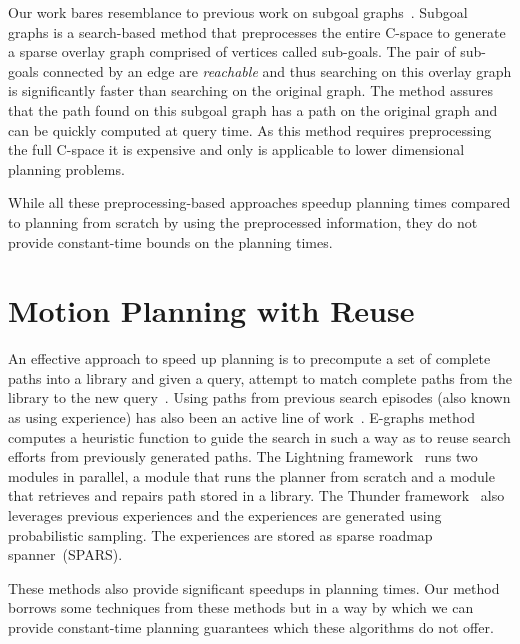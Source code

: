 \documentclass[a4paper]{report}
\begin{document}
Our work bares resemblance to previous work on 
subgoal graphs~\cite{UK17,UK18}.
Subgoal graphs is a search-based method that preprocesses the entire C-space to generate a sparse overlay graph comprised of vertices called sub-goals. The pair of sub-goals connected by an edge are \emph{reachable} and thus searching on this overlay graph is significantly faster than searching on the original graph. The method assures that the path found on this subgoal graph has a path on the original graph and can be quickly computed at query time. As this method requires preprocessing the full C-space it is expensive and only is applicable to lower dimensional planning problems.

While all these preprocessing-based approaches speedup planning times compared to planning from scratch by using the preprocessed information, they do not provide constant-time bounds on the planning times.

\section{Motion Planning with Reuse}
An effective approach to speed up planning is to precompute a set of complete paths into a library and given a query, attempt to match complete paths from the library to the new query~\cite{berenson2012robot,jetchev2013fast}.
Using paths from previous search episodes (also known as using experience) has also been an active line of work~\cite{PCCL12,PDCL13,BAG12,CSMOC15}. E-graphs method~\cite{PCCL12} computes a heuristic function to guide the search in such a way as to reuse search efforts from previously generated paths. The Lightning framework~\cite{BAG12} runs two modules in parallel, a module that runs the planner from scratch and a module that retrieves and repairs path stored in a library. The Thunder framework~\cite{CSMOC15} also leverages previous experiences and the experiences are generated using probabilistic sampling. The experiences are stored as sparse roadmap spanner~(SPARS). 

These methods also provide significant speedups in planning times. Our method borrows some techniques from these methods but in a way by which we can provide constant-time planning guarantees which these algorithms do not offer.
\end{document}
